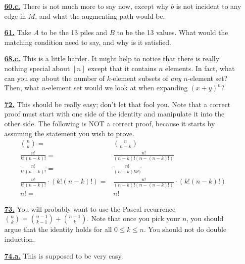 \documentclass[10pt,]{book}
\theoremstyle{plain}
\theoremstyle{definition}
\theoremstyle{definition}
\theoremstyle{definition}
\numberwithin{equation}{chapter}
\newcommand{\amp}{&}
\begin{document}
\begin{itemize}[itemsep=1em]
\hypertarget{a-60.c}{}\item[\textbf{\hyperref[task-65]{60.c.}}]
\hypertarget{p-456}{}%
There is not much more to say now, except why \(b\) is not incident to any edge in \(M\), and what the augmenting path would be.%

\hypertarget{a-61}{}\item[\textbf{\hyperref[activity-54]{61.}}]
\hypertarget{p-459}{}%
Take \(A\) to be the 13 piles and \(B\) to be the 13 values.  What would the matching condition need to say, and why is it satisfied.%

\hypertarget{a-68.c}{}\item[\textbf{\hyperref[task-90]{68.c.}}]
\hypertarget{p-510}{}%
This is a little harder.  It might help to notice that there is really nothing special about \([n]\) except that it contains \(n\) elements.  In fact, what can you say about the number of \(k\)-element subsets of \emph{any} \(n\)-element set?  Then, what \(n\)-element set would we look at when expanding \((x+y)^n\)?%

\hypertarget{a-72}{}\item[\textbf{\hyperref[activity-65]{72.}}]
\hypertarget{p-553}{}%
This should be really easy; don't let that fool you.  Note that a correct proof must start with one side of the identity and manipulate it into the other side.  The following is NOT a correct proof, because it starts by assuming the statement you wish to prove.%
\begin{align*}
\binom{n}{k}  = \amp \binom{n}{n-k}\\
\frac{n!}{k!(n-k)!} =  \amp \frac{n!}{(n-k)!(n-(n-k)!)}\\
\frac{n!}{k!(n-k)!} =  \amp \frac{n!}{(n-k)!k!)}\\
\frac{n!}{k!(n-k)!} \cdot (k!(n-k)!)=  \amp \frac{n!}{(n-k)!(n-(n-k)!)}\cdot(k!(n-k)!)\\
n! =  \amp n!
\end{align*}
%

\hypertarget{a-73}{}\item[\textbf{\hyperref[activity-66]{73.}}]
\hypertarget{p-556}{}%
You will probably want to use the Pascal recurrence \(\binom{n}{k} = \binom{n-1}{k-1} + \binom{n-1}{k}\).  Note that once you pick your \(n\), you should argue that the identity holds for all \(0 \le k \le n\).  You should not do double induction.%

\hypertarget{a-74.a}{}\item[\textbf{\hyperref[task-102]{74.a.}}]
\hypertarget{p-559}{}%
This is supposed to be very easy.%


\end{itemize}
\end{document}

